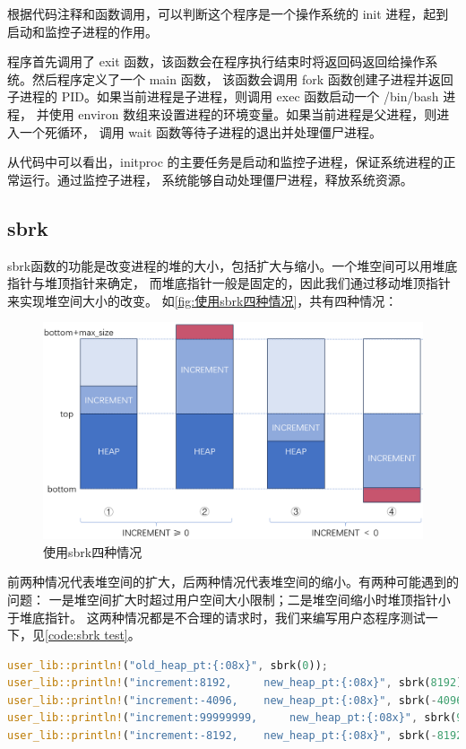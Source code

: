 根据代码注释和函数调用，可以判断这个程序是一个操作系统的 init 进程，起到启动和监控子进程的作用。

程序首先调用了 exit 函数，该函数会在程序执行结束时将返回码返回给操作系统。然后程序定义了一个 main 函数，
该函数会调用 fork 函数创建子进程并返回子进程的 PID。如果当前进程是子进程，则调用 exec 函数启动一个 /bin/bash 进程，
并使用 environ 数组来设置进程的环境变量。如果当前进程是父进程，则进入一个死循环，
调用 wait 函数等待子进程的退出并处理僵尸进程。

从代码中可以看出，initproc 的主要任务是启动和监控子进程，保证系统进程的正常运行。通过监控子进程，
系统能够自动处理僵尸进程，释放系统资源。


\subsection{sbrk}

sbrk函数的功能是改变进程的堆的大小，包括扩大与缩小。一个堆空间可以用堆底指针与堆顶指针来确定，
而堆底指针一般是固定的，因此我们通过移动堆顶指针来实现堆空间大小的改变。
如\autoref{fig:使用sbrk四种情况}，共有四种情况：

\begin{figure}[htb]
    \centering
    \includegraphics[width=\textwidth]{figures/03-01-使用sbrk四种情况.png}
    \caption{
        使用sbrk四种情况
    }
    \label{fig:使用sbrk四种情况}
\end{figure}

前两种情况代表堆空间的扩大，后两种情况代表堆空间的缩小。有两种可能遇到的问题：
一是堆空间扩大时超过用户空间大小限制；二是堆空间缩小时堆顶指针小于堆底指针。
这两种情况都是不合理的请求时，我们来编写用户态程序测试一下，见\autoref{code:sbrk test}。

\begin{lstlisting}[language={Rust}, label={code:sbrk test},
    caption={sbrk test}]
user_lib::println!("old_heap_pt:{:08x}", sbrk(0));
user_lib::println!("increment:8192, 	new_heap_pt:{:08x}", sbrk(8192));
user_lib::println!("increment:-4096, 	new_heap_pt:{:08x}", sbrk(-4096));
user_lib::println!("increment:99999999, 	new_heap_pt:{:08x}", sbrk(99999999));
user_lib::println!("increment:-8192, 	new_heap_pt:{:08x}", sbrk(-8192));
\end{lstlisting}

